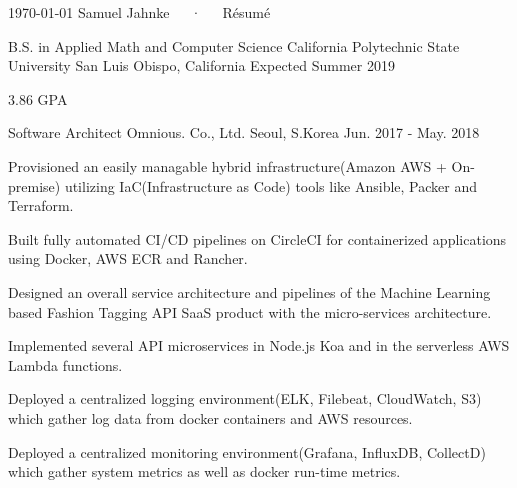 \documentclass[11pt, a4paper]{awesome-cv}
\begin{document}
\makecvheader[C]

\makecvfooter
{\today}
{Samuel Jahnke~~~·~~~Résumé}
{\thepage}

\begin{cventries}


  \cventry
  {B.S. in Applied Math and Computer Science} %
  {California Polytechnic State University} %
  {San Luis Obispo, California} %
  {Expected Summer 2019} %
  {
    \begin{cvitems} %
      \item {3.86 GPA}
    \end{cvitems}
  }


  \cventry
  {Software Architect} %
  {Omnious. Co., Ltd.} %
  {Seoul, S.Korea} %
  {Jun. 2017 - May. 2018} %
  {
    \begin{cvitems} %
      \item {Provisioned an easily managable hybrid infrastructure(Amazon AWS + On-premise) utilizing IaC(Infrastructure as Code) tools like Ansible, Packer and Terraform.}
      \item {Built fully automated CI/CD pipelines on CircleCI for containerized applications using Docker, AWS ECR and Rancher.}
      \item {Designed an overall service architecture and pipelines of the Machine Learning based Fashion Tagging API SaaS product with the micro-services architecture.}
      \item {Implemented several API microservices in Node.js Koa and in the serverless AWS Lambda functions.}
      \item {Deployed a centralized logging environment(ELK, Filebeat, CloudWatch, S3) which gather log data from docker containers and AWS resources.}
      \item {Deployed a centralized monitoring environment(Grafana, InfluxDB, CollectD) which gather system metrics as well as docker run-time metrics.}
    \end{cvitems}
  }

\end{cventries}
\end{document}
